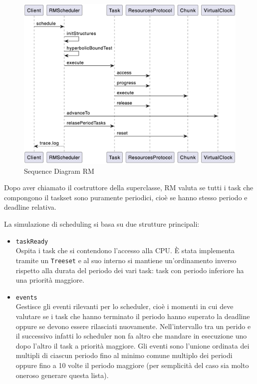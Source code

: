 \begin{figure}[htbp]
    \centering
    \includegraphics[width=.9\textwidth]{immagini/sequence diagram RM.pdf}
    \caption{Sequence Diagram RM}
    \label{fig:sdRM}
\end{figure}

\myskip

Dopo aver chiamato il costruttore della superclasse, RM valuta se tutti i task che compongono il taskset sono puramente periodici, cioè se hanno stesso periodo e deadline relativa.

\myskip

La simulazione di scheduling si basa su due strutture principali:
\begin{itemize}
    \item \texttt{taskReady} \\
        Ospita i task che si contendono l'accesso alla CPU. È stata implementa tramite un \texttt{Treeset} e al suo interno si mantiene un'ordinamento inverso rispetto alla durata del periodo dei vari task: task con periodo inferiore ha una priorità maggiore.
    \item \texttt{events} \\
        Gestisce gli eventi rilevanti per lo scheduler, cioè i momenti in cui deve valutare se i task che hanno terminato il periodo hanno superato la deadline oppure se devono essere rilasciati nuovamente. Nell'intervallo tra un perido e il successivo infatti lo scheduler non fa altro che mandare in esecuzione uno dopo l'altro il task a priorità maggiore. Gli eventi sono l’unione ordinata dei multipli di ciascun periodo fino al minimo comune multiplo dei periodi oppure fino a 10 volte il periodo maggiore (per semplicità del caso sia molto oneroso generare questa lista).
\end{itemize}


